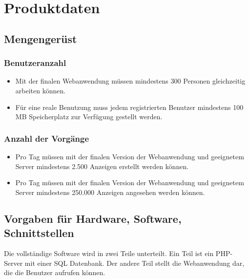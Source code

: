 \documentclass[a4paper,12pt,oneside]{scrartcl}
\begin{document}
\section{Produktdaten}
\subsection{Mengengerüst}

\subsubsection*{Benutzeranzahl}
\begin{itemize}
	\item Mit der finalen Webanwendung müssen mindestens 300 Personen gleichzeitig arbeiten können.
	\item Für eine reale Benutzung muss jedem registrierten Benutzer mindestens 100 MB Speicherplatz zur Verfügung gestellt werden.
\end{itemize}

\subsubsection*{Anzahl der Vorgänge}
\begin{itemize}
	\item Pro Tag müssen mit der finalen Version der Webanwendung und geeignetem Server mindestens 2.500 Anzeigen erstellt werden können.
	\item Pro Tag müssen mit der finalen Version der Webanwendung und geeignetem Server mindestens 250.000 Anzeigen angesehen werden können.
\end{itemize}


\subsection{Vorgaben für Hardware, Software, Schnittstellen}
Die vollständige Software wird in zwei Teile unterteilt.
Ein Teil ist ein PHP-Server mit einer SQL Datenbank.
Der andere Teil stellt die Webanwendung dar, die die Benutzer aufrufen können.
\end{document}
